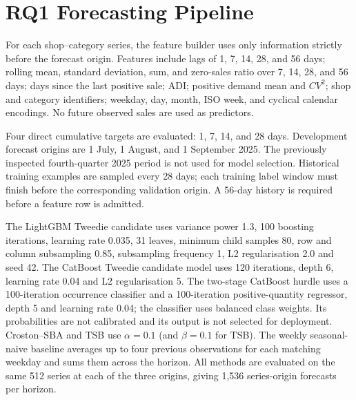 \documentclass[a4paper,11pt,oneside]{book}
\theoremstyle{plain}
\theoremstyle{definition}
\theoremstyle{remark}
\begin{document}
\section{RQ1 Forecasting Pipeline}

For each shop--category series, the feature builder uses only information
strictly before the forecast origin. Features include lags of 1, 7, 14, 28,
and 56 days; rolling mean, standard deviation, sum, and zero-sales ratio
over 7, 14, 28, and 56 days; days since the last positive sale; ADI; positive
demand mean and \(CV^2\); shop and category identifiers; weekday, day,
month, ISO week, and cyclical calendar encodings. No future observed sales
are used as predictors.

Four direct cumulative targets are evaluated: 1, 7, 14, and 28 days.
Development forecast origins are 1 July, 1 August, and 1 September 2025.
The previously inspected fourth-quarter 2025 period is not used for model
selection. Historical training examples are sampled every 28 days; each
training label window must finish before the corresponding validation origin.
A 56-day history is required before a feature row is admitted.

The LightGBM Tweedie candidate uses variance power 1.3, 100 boosting
iterations, learning rate 0.035, 31 leaves, minimum child samples 80,
row and column subsampling 0.85, subsampling frequency 1, L2 regularisation
2.0 and seed 42. The CatBoost Tweedie candidate model uses 120 iterations,
depth 6, learning rate 0.04 and L2 regularisation 5. The two-stage CatBoost
hurdle uses a 100-iteration occurrence classifier and a 100-iteration
positive-quantity regressor, depth 5 and learning rate 0.04; the classifier
uses balanced class weights. Its probabilities are not calibrated and its
output is not selected for deployment. Croston--SBA and TSB use
\(\alpha=0.1\) (and \(\beta=0.1\) for TSB). The weekly seasonal-naive
baseline averages up to four previous observations for each matching
weekday and sums them across the horizon. All methods are evaluated on
the same 512 series at each of the three origins, giving 1,536
series-origin forecasts per horizon.
\end{document}
